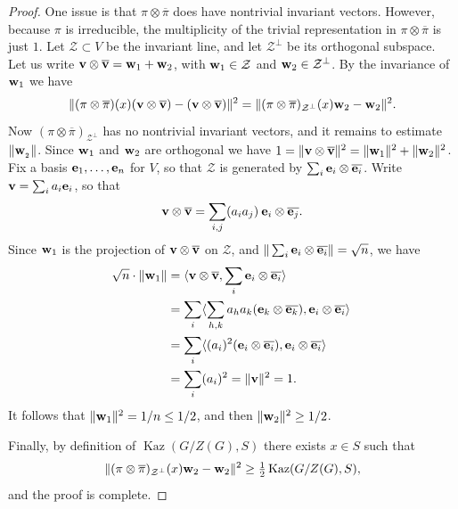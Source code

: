 \documentclass[11pt,reqno]{amsart}
\numberwithin{equation}{section}
\theoremstyle{definition}
\theoremstyle{remark}
\newcommand{\Kaz}{\mathop{\mathrm{Kaz}}}
\begin{document}
\begin{proof}
       One issue is that $\pi \otimes \overline{\pi}$ does have nontrivial invariant vectors.
       However, because $\pi$ is irreducible,
       the multiplicity of the trivial representation in $\pi \otimes \overline{\pi}$ is just $1$.
       Let $\mathcal{Z} \subset V$ be the invariant line,
       and let $\mathcal{Z}^\perp$ be its orthogonal subspace.
       Let us write ${\bf v} \otimes {\bf \overline{v}} = {\bf w}_1 + {\bf w}_2$,
       with ${\bf w}_1 \in \mathcal{Z}$ and ${\bf w}_2 \in \mathcal{Z}^\perp$.
       By the invariance of ${\bf w}_1$ we have
       $$ \| (\pi \otimes \overline{\pi})(x) ({\bf v} \otimes {\bf \overline{v}}) - ({\bf v} \otimes {\bf \overline{v}}) \|^2  =
       \| (\pi \otimes \overline{\pi})_{\mathcal{Z}^\perp}(x) {\bf w}_2 - {\bf w}_2 \|^2 . $$
       Now $(\pi \otimes \overline{\pi})_{\mathcal{Z}^\perp}$ has no nontrivial invariant vectors,
      and it remains to estimate $\| {\bf w}_{_2} \|$.
     Since ${\bf w}_1$ and ${\bf w}_2$ are orthogonal we have
      $1 = \| {\bf v} \otimes {\bf \overline{v}} \|^2 = 
      \| {\bf w}_1 \|^2 + \| {\bf w}_2 \|^2$.
      Fix a basis ${\bf e}_1,\ldots,{\bf e}_n$ for $V$,
      so that $\mathcal{Z}$ is generated by $\sum_i {\bf e}_i \otimes \overline{{\bf e}_i}$.
       Write ${\bf v}=\sum_i a_i {\bf e}_i$, so that
       $$ {\bf v} \otimes {\bf \overline{v}} = \sum_{i,j} (a_i a_j) \> {\bf e}_i \otimes \overline{{\bf e}_j} . $$
       Since ${\bf w}_1$ is the projection of ${\bf v} \otimes {\bf \overline{v}}$ on $\mathcal{Z}$,
       and $\| \sum_{i} {\bf e}_i \otimes \overline{{\bf e}_i} \| = \sqrt{n}$,
       we have
       \[\begin{split}
		\sqrt{n} \cdot \| {\bf w}_1 \|
		&= \langle {\bf v} \otimes {\bf \overline{v}} , \sum_{i} {\bf e}_i \otimes \overline{{\bf e}_i} \rangle
		\\&= \sum_i \langle \sum_{h,k} a_ha_k ({\bf e}_k \otimes \overline{{\bf e}_k}) , {\bf e}_i \otimes \overline{{\bf e}_i} \rangle
		\\&= \sum_i \langle (a_i)^2 ({\bf e}_i \otimes \overline{{\bf e}_i}) , {\bf e}_i \otimes \overline{{\bf e}_i} \rangle
		\\&= \sum_i (a_i)^2 = \| {\bf v} \|^2 = 1 .
	\end{split} \, \] 
       It follows that $\| {\bf w}_1 \|^2 = 1/n \leq 1/2$, and then $\| {\bf w}_2 \|^2 \geq 1/2$.
       
      Finally, by definition of $\Kaz(G/Z(G),S)$ there exists $x \in S$ such that
      $$ \| (\pi \otimes \overline{\pi})_{\mathcal{Z}^\perp} (x) {\bf w}_2 - {\bf w}_2 \|^2 \geq
       \tfrac{1}{2} \Kaz(G/Z(G),S) , $$
    and the proof is complete.
       \end{proof}
\end{document}
